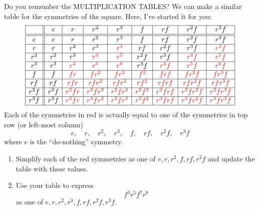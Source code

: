 \documentclass[noauthor,nooutcomes,hints,handout]{ximera}
\begin{document}
\begin{question}
  Do you remember the MULTIPLICATION TABLES? We can make a similar
  table for the symmetries of the square. Here, I've started it for
  you:
  \[
  \begin{array}{|c||c|c|c|c|c|c|c|c|}
    \hline
         & e    & r     & r^2     & r^3      & f      & rf     & r^2f      &  r^3 f\\ \hline\hline
    e    & e    & r     & r^2     & r^3      & f      & rf     & r^2f      &  r^3 f\\ \hline
    r    & r    & r^2   & r^3     & \color{red}r^4      & rf     & r^2f   & r^3f      & \color{red}r^4f\\ \hline
    r^2  & r^2  & r^3   & \color{red}r^4     & \color{red}r^5      & r^2f   & r^3f   & \color{red}r^4f      & \color{red}r^5f\\ \hline
    r^3  & r^3  & \color{red}r^4   & \color{red}r^5     & \color{red}r^6      & r^3f   & \color{red}r^4f   & \color{red}r^5f      & \color{red}r^6f\\ \hline
    f    & f    & \color{red}fr    & \color{red}fr^2    & \color{red}fr^3     & \color{red}f^2    & \color{red}frf    & \color{red}fr^2f     & \color{red}fr^3f\\ \hline
    rf   & rf   & \color{red}rfr   & \color{red}rfr^2   & \color{red}rfr^3    & \color{red}rf^2   & \color{red}rfrf   & \color{red}rfr^2f    & \color{red}rfr^3f\\ \hline
    r^2f & r^2f & \color{red}r^2fr & \color{red}r^2fr^2 & \color{red}r^2fr^3  & \color{red}r^2f^2 & \color{red}r^2frf & \color{red}r^2fr^2f  & \color{red}r^2fr^3f\\ \hline
    r^3f & r^3f & \color{red}r^3fr & \color{red}r^3fr^2 & \color{red}r^3fr^3  & \color{red}r^3f^2 & \color{red}r^3frf & \color{red}r^3f r^2f & \color{red}r^3fr^3f\\ \hline
  \end{array}
  \]
  Each of the symmetries in red is actually equal to one of the
  symmetries in top row (or left-most column)
  \[
  e,\quad r,\quad r^2,\quad r^3,\quad f,\quad rf,\quad r^2f,\quad r^3f
  \]
  where $e$ is the ``do-nothing'' symmetry.
  \begin{enumerate}
    \item Simplify each of the red symmetries as one of
      $e,r,r^2,f,rf,r^2f$ and update the table with these values.
    \item Use your table to express
      \[
      f^3r^5f^7r^9
      \]
      as one of $e,r,r^2,r^3,f,rf,r^2f, r^3f$.

\end{enumerate}
\end{question}
\end{document}
